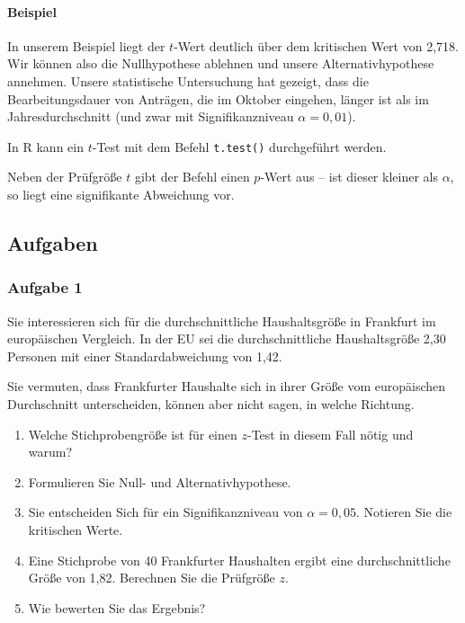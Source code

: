 \documentclass[
  ngerman,
]{article}
\providecommand{\tightlist}{%
  \setlength{\itemsep}{0pt}\setlength{\parskip}{0pt}}
\begin{document}
\hypertarget{beispiel-10}{%
\paragraph{Beispiel}\label{beispiel-10}}

In unserem Beispiel liegt der \(t\)-Wert deutlich über dem kritischen Wert von 2,718. Wir können also die Nullhypothese ablehnen und unsere Alternativhypothese annehmen. Unsere statistische Untersuchung hat gezeigt, dass die Bearbeitungsdauer von Anträgen, die im Oktober eingehen, länger ist als im Jahresdurchschnitt (und zwar mit Signifikanzniveau \(\alpha=0,01\)).

\begin{rtip}
In R kann ein $t$-Test mit dem Befehl {\tt t.test()} durchgeführt werden.

Neben der Prüfgröße $t$ gibt der Befehl einen $p$-Wert aus -- ist dieser kleiner als $\alpha$, so liegt eine signifikante Abweichung vor.
\end{rtip}

\hypertarget{aufgaben-4}{%
\subsection{Aufgaben}\label{aufgaben-4}}

\hypertarget{aufgabe-1-4}{%
\subsubsection{Aufgabe 1}\label{aufgabe-1-4}}

Sie interessieren sich für die durchschnittliche Haushaltsgröße in Frankfurt im europäischen Vergleich. In der EU sei die durchschnittliche Haushaltsgröße 2,30 Personen mit einer Standardabweichung von 1,42.

Sie vermuten, dass Frankfurter Haushalte sich in ihrer Größe vom europäischen Durchschnitt unterscheiden, können aber nicht sagen, in welche Richtung.

\begin{enumerate}
\def\labelenumi{\alph{enumi})}
\tightlist
\item
  Welche Stichprobengröße ist für einen \(z\)-Test in diesem Fall nötig und warum?
\item
  Formulieren Sie Null- und Alternativhypothese.
\item
  Sie entscheiden Sich für ein Signifikanzniveau von \(\alpha=0{,}05\). Notieren Sie die kritischen Werte.
\item
  Eine Stichprobe von 40 Frankfurter Haushalten ergibt eine durchschnittliche Größe von 1,82. Berechnen Sie die Prüfgröße \(z\).
\item
  Wie bewerten Sie das Ergebnis?
\end{enumerate}
\end{document}
